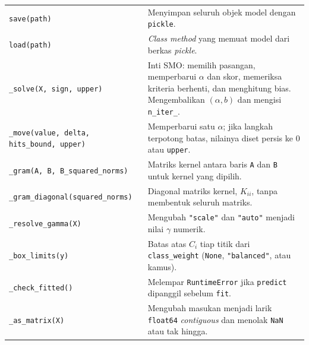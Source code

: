 \begin{table}[H]
\begin{tabularx}{\textwidth}{>{\raggedright\arraybackslash}p{4.8cm} Y}
		\texttt{save(path)} & Menyimpan seluruh objek model dengan \texttt{pickle}. \\
		\texttt{load(path)} & \textit{Class method} yang memuat model dari berkas \textit{pickle}. \\
		\texttt{\_solve(X, sign, upper)} & Inti SMO: memilih pasangan, memperbarui $\alpha$ dan skor, memeriksa kriteria berhenti, dan menghitung bias. Mengembalikan $(\alpha, b)$ dan mengisi \texttt{n\_iter\_}. \\
		\texttt{\_move(value, delta, hits\_bound, upper)} & Memperbarui satu $\alpha$; jika langkah terpotong batas, nilainya diset persis ke $0$ atau \texttt{upper}. \\
		\texttt{\_gram(A, B, B\_squared\_norms)} & Matriks kernel antara baris \texttt{A} dan \texttt{B} untuk kernel yang dipilih. \\
		\texttt{\_gram\_diagonal\allowbreak(squared\_norms)} & Diagonal matriks kernel, $K_{ii}$, tanpa membentuk seluruh matriks. \\
		\texttt{\_resolve\_gamma(X)} & Mengubah \texttt{"scale"} dan \texttt{"auto"} menjadi nilai $\gamma$ numerik. \\
		\texttt{\_box\_limits(y)} & Batas atas $C_i$ tiap titik dari \texttt{class\_weight} (\texttt{None}, \texttt{"balanced"}, atau kamus). \\
		\texttt{\_check\_fitted()} & Melempar \texttt{RuntimeError} jika \texttt{predict} dipanggil sebelum \texttt{fit}. \\
		\texttt{\_as\_matrix(X)} & Mengubah masukan menjadi larik \texttt{float64} \textit{contiguous} dan menolak \texttt{NaN} atau tak hingga. \\
		\bottomrule
	\end{tabularx}
\end{table}

